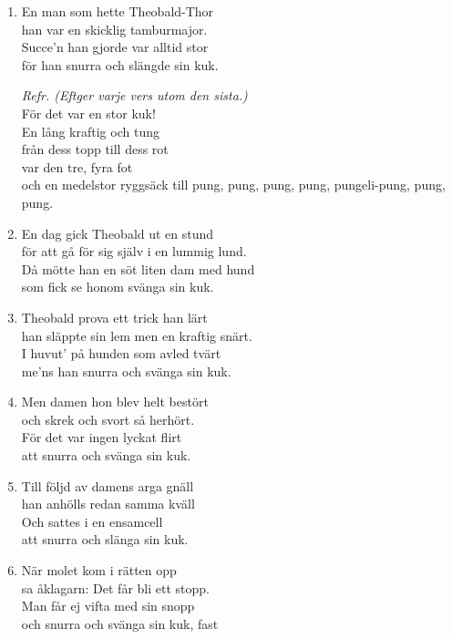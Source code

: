 \documentclass[twoside, openright]{report}
\begin{document}
\begin{enumerate}
\item En man som hette Theobald-Thor\\
han var en skicklig tamburmajor.\\
Succe'n han gjorde var alltid stor\\
för han snurra och slängde sin kuk.

\textit{Refr. (Eftger varje vers utom den sista.)}\\
För det var en stor kuk!\\
En lång kraftig och tung\\
från dess topp till dess rot\\
var den tre, fyra fot\\
och en medelstor ryggsäck till pung, pung, pung, pung, pungeli-pung, pung, pung.\\

\item En dag gick Theobald ut en stund\\
för att gå för sig själv i en lummig lund.\\
Då mötte han en söt liten dam med hund\\
som fick se honom svänga sin kuk.

\item Theobald prova ett trick han lärt\\
han släppte sin lem men en kraftig snärt.\\
I huvut' på hunden som avled tvärt\\
me'ns han snurra och svänga sin kuk.

\item Men damen hon blev helt bestört\\
och skrek och svort så herhört.\\
För det var ingen lyckat flirt\\
att snurra och svänga sin kuk.

\item Till följd av damens arga gnäll\\
han anhölls redan samma kväll\\
Och sattes i en ensamcell\\
att snurra och slänga sin kuk.

\item När molet kom i rätten opp\\
sa åklagarn: Det får bli ett stopp.\\
Man får ej vifta med sin snopp\\
och snurra och svänga sin kuk, fast


\end{enumerate}
\end{document}

